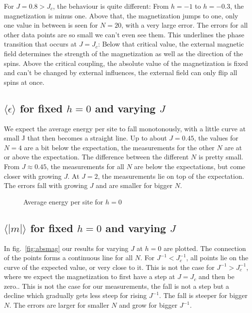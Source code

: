 \documentclass{scrartcl}
\begin{document}
For $J=0.8>J_c$, the behaviour is quite different: From $h=-1$ to $h=-0.3$, the magnetization is minus one. Above that, the magnetization jumps to one, only one value in between is seen for $N=20$, with a very large error. The errors for all other data points are so small we can't even see them. This underlines the phase transition that occurs at $J=J_c$: Below that critical value, the external magnetic field determines the strength of the magnetization as well as the direction of the spins. Above the critical coupling, the absolute value of the magnetization is fixed and can't be changed by external influences, the external field can only flip all spins at once.


\subsection{$\langle \epsilon\rangle$ for fixed $h=0$ and varying $J$}
We expect the average energy per site to fall monotonously, with a little curve at small J that then becomes a straight line. Up to about $J=0.45$, the values for $N=4$ are a bit below the expectation, the measurements for the other $N$ are at or above the expectation. The difference between the different $N$ is pretty small. From $J\approx0.45$, the measurements for all $N$ are below the expectations, but come closer with growing $J$. At $J=2$, the measurements lie on top of the expectation. The errors fall with growing $J$ and are smaller for bigger $N$.

	\begin{figure}[htbp]
		
		\caption{Average energy per site for $h=0$}
		\label{fig:energy}
	\end{figure}

\subsection{$\langle |m|\rangle$ for fixed $h=0$ and varying $J$}
In fig.~\ref{fig:absmag} our results for varying $J$ at $h=0$ are plotted. The connection of the points forms a continuous line for all $N$. For $J^{-1}<J_c^{-1}$, all points lie on the curve of the expected value, or very close to it. This is not the case for $J^{-1}>J_c^{-1}$, where we expect the magnetization to first have a step at $J=J_c$ and then be zero.. This is not the case for our measurements, the fall is not a step but a decline which gradually gets less steep for rising $J^{-1}$. The fall is steeper for bigger $N$. The errors are larger for smaller $N$ and grow for bigger $J^{-1}$.
\end{document}
